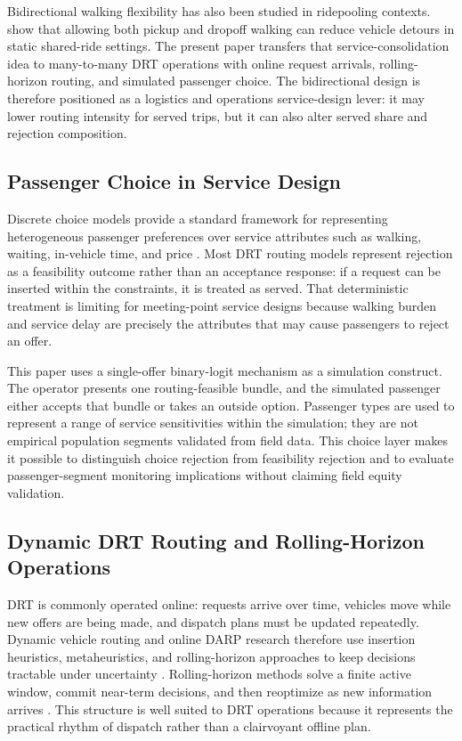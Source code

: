 Bidirectional walking flexibility has also been studied in ridepooling contexts.
\citet{fielbaum2021} show that allowing both pickup and dropoff walking can reduce
vehicle detours in static shared-ride settings. The present paper transfers that
service-consolidation idea to many-to-many DRT operations with online request arrivals,
rolling-horizon routing, and simulated passenger choice. The bidirectional design is
therefore positioned as a logistics and operations service-design lever: it may lower
routing intensity for served trips, but it can also alter served share and rejection
composition.

\subsection{Passenger Choice in Service Design}

Discrete choice models provide a standard framework for representing heterogeneous
passenger preferences over service attributes such as walking, waiting, in-vehicle time,
and price \citep{mcfadden1974,benakiva1985,train2009,lavieri2019}. Most DRT routing
models represent rejection as a feasibility outcome rather than an acceptance response:
if a request can be inserted within the constraints, it is treated as served. That
deterministic treatment is limiting for meeting-point service designs because walking
burden and service delay are precisely the attributes that may cause passengers to reject
an offer.

This paper uses a single-offer binary-logit mechanism as a simulation construct. The
operator presents one routing-feasible bundle, and the simulated passenger either accepts
that bundle or takes an outside option. Passenger types are used to represent a range of
service sensitivities within the simulation; they are not empirical population segments
validated from field data. This choice layer makes it possible to distinguish
choice rejection from feasibility rejection and to evaluate passenger-segment monitoring
implications without claiming field equity validation.

\subsection{Dynamic DRT Routing and Rolling-Horizon Operations}

DRT is commonly operated online: requests arrive over time, vehicles move while new
offers are being made, and dispatch plans must be updated repeatedly. Dynamic vehicle
routing and online DARP research therefore use insertion heuristics, metaheuristics, and
rolling-horizon approaches to keep decisions tractable under uncertainty
\citep{psaraftis1988,pillac2013,ho2018}. Rolling-horizon methods solve a finite active
window, commit near-term decisions, and then reoptimize as new information arrives
\citep{bent2004}. This structure is well suited to DRT operations because it represents
the practical rhythm of dispatch rather than a clairvoyant offline plan.

